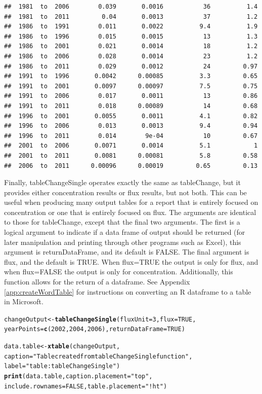 \documentclass[a4paper,11pt]{article}\usepackage{graphicx, color}
\makeatletter
\newcommand{\hlfunctioncall}[1]{\textcolor[rgb]{0.501960784313725,0,0.329411764705882}{\textbf{#1}}}%
\newcommand{\hlstring}[1]{\textcolor[rgb]{0.6,0.6,1}{#1}}%
\newenvironment{kframe}{%
 \def\at@end@of@kframe{}%
 \ifinner\ifhmode%
  \def\at@end@of@kframe{\end{minipage}}%
  \begin{minipage}{\columnwidth}%
 \fi\fi%
 \def\FrameCommand##1{\hskip\@totalleftmargin \hskip-\fboxsep
 \colorbox{shadecolor}{##1}\hskip-\fboxsep
     \hskip-\linewidth \hskip-\@totalleftmargin \hskip\columnwidth}%
 \MakeFramed {\advance\hsize-\width
   \@totalleftmargin\z@ \linewidth\hsize
   \@setminipage}}%
 {\par\unskip\endMakeFramed%
 \at@end@of@kframe}
\newenvironment{knitrout}{}{} %
\makeatother
\begin{document}
\begin{knitrout}
\begin{kframe}
\begin{verbatim}
##  1981  to  2006        0.039       0.0016           36          1.4
##  1981  to  2011         0.04       0.0013           37          1.2
##  1986  to  1991        0.011       0.0022          9.4          1.9
##  1986  to  1996        0.015       0.0015           13          1.3
##  1986  to  2001        0.021       0.0014           18          1.2
##  1986  to  2006        0.028       0.0014           23          1.2
##  1986  to  2011        0.029       0.0012           24         0.97
##  1991  to  1996       0.0042      0.00085          3.3         0.65
##  1991  to  2001       0.0097      0.00097          7.5         0.75
##  1991  to  2006        0.017       0.0011           13         0.86
##  1991  to  2011        0.018      0.00089           14         0.68
##  1996  to  2001       0.0055       0.0011          4.1         0.82
##  1996  to  2006        0.013       0.0013          9.4         0.94
##  1996  to  2011        0.014        9e-04           10         0.67
##  2001  to  2006       0.0071       0.0014          5.1            1
##  2001  to  2011       0.0081      0.00081          5.8         0.58
##  2006  to  2011      0.00096      0.00019         0.65         0.13
\end{verbatim}
\end{kframe}
\end{knitrout}


Finally, tableChangeSingle operates exactly the same as tableChange, but it provides either concentration results or flux results, but not both.  This can be useful when producing many output tables for a report that is entirely focused on concentration or one that is entirely focused on flux.  The arguments are identical to those for tableChange, except that the final two arguments.  The first is a logical argument to indicate if a data frame of output should be returned (for later manipulation and printing through other programs such as Excel), this argument is returnDataFrame, and its default is FALSE.  The final argument is flux, and the default is TRUE.  When flux=TRUE the output is only for flux, and when flux=FALSE the output is only for concentration.  Additionally, this function allows for the return of a dataframe.  See Appendix \ref{app:createWordTable} for instructions on converting an R dataframe to a table in Microsoft.


\begin{knitrout}
\color{fgcolor}\begin{kframe}
\begin{alltt}
changeOutput <- \hlfunctioncall{tableChangeSingle}(fluxUnit=3, flux=TRUE,
        yearPoints=\hlfunctioncall{c}(2002,2004,2006), returnDataFrame = TRUE)

data.table <- \hlfunctioncall{xtable}(changeOutput, 
        caption=\hlstring{"Table created from tableChangeSingle function"},
        label=\hlstring{"table:tableChangeSingle"})
\hlfunctioncall{print}(data.table, caption.placement=\hlstring{"top"},
      include.rownames=FALSE,table.placement=\hlstring{"!ht"})
\end{alltt}
\end{kframe}
\end{knitrout}
\end{document}
